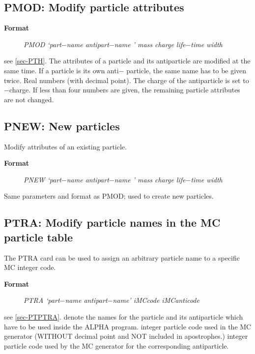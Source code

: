 \subsection{\label{sec-DCPMOD}PMOD: Modify particle attributes}
\par
\par
\begin{description}\item[\bf{Format}]
{\it PMOD `part$-$name antipart$-$name ' mass charge life$-$time width}
\end{description}
\begin{indentlist}{ 3.75cm}{ 4.00cm}
see \ref{sec-PTH}.
The attributes of a particle and its antiparticle are
modified at the same time. If a particle is its own anti$-$
particle, the same name has to be given twice.
Real numbers (with decimal point).
The charge of the antiparticle is set to $-$charge. If less than
four numbers are given, the remaining particle attributes
are not changed.
\end{indentlist}
\subsection{\label{sec-DCPNEW}PNEW: New particles}
\par
\par Modify attributes of an existing particle.
\begin{description}\item[\bf{Format
}]
{\it PNEW `part$-$name antipart$-$name ' mass charge life$-$time width}
\end{description}
Same parameters and format as PMOD; used to create new particles.
\par
\subsection{\label{sec-DCPTRA}PTRA: Modify particle names in the
MC particle table}
\par
The PTRA card can be used to assign an arbitrary particle name to
a
specific MC integer code.
\begin{description}\item[\bf{Format
}]{\it PTRA `part$-$name antipart$-$name' iMCcode iMCanticode}\end{description}
\begin{indentlist}{ 3.75cm}{ 4.00cm}
see \ref{sec-PTPTRA}.
denote the names for the particle and its antiparticle
which have to be used inside the ALPHA program.
integer particle code used in the MC generator
(WITHOUT decimal point and NOT included in apostrophes.)
integer particle code used by the MC
generator for the corresponding antiparticle.
\end{indentlist}
\par
